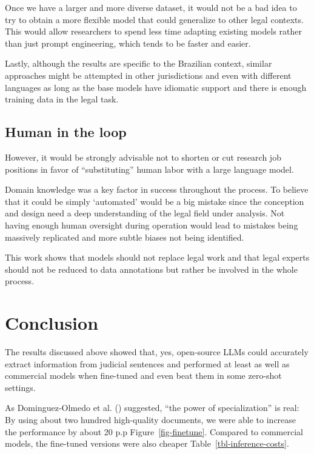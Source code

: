 \documentclass[
  12pt,
]{article}
\begin{document}
Once we have a larger and more diverse dataset, it would not be a bad
idea to try to obtain a more flexible model that could generalize to
other legal contexts. This would allow researchers to spend less time
adapting existing models rather than just prompt engineering, which
tends to be faster and easier.

Lastly, although the results are specific to the Brazilian context,
similar approaches might be attempted in other jurisdictions and even
with different languages as long as the base models have idiomatic
support and there is enough training data in the legal task.

\subsection{Human in the loop}\label{human-in-the-loop}

However, it would be strongly advisable not to shorten or cut research
job positions in favor of ``substituting'' human labor with a large
language model.

Domain knowledge was a key factor in success throughout the process. To
believe that it could be simply `automated' would be a big mistake since
the conception and design need a deep understanding of the legal field
under analysis. Not having enough human oversight during operation would
lead to mistakes being massively replicated and more subtle biases not
being identified.

This work shows that models should not replace legal work and that legal
experts should not be reduced to data annotations but rather be involved
in the whole process.

\section{Conclusion}\label{sec-conclusion}

The results discussed above showed that, yes, open-source LLMs could
accurately extract information from judicial sentences and performed at
least as well as commercial models when fine-tuned and even beat them in
some zero-shot settings.

As Dominguez-Olmedo et al.
() suggested, ``the
power of specialization'' is real: By using about two hundred
high-quality documents, we were able to increase the performance by
about 20 p.p Figure~\ref{fig-finetune}. Compared to commercial models,
the fine-tuned versions were also cheaper
Table~\ref{tbl-inference-costs}.
\end{document}
